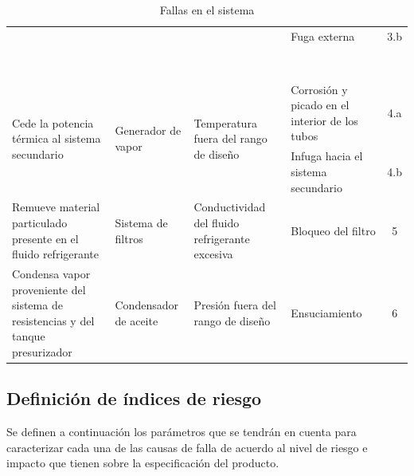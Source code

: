 \documentclass{article}
\begin{document}
\begin{table}[H]
\begin{tabularx}{\textwidth}{XXXXc}
 & & & Fuga externa &  3.b\\ \\ \\ \\ \\ \\ \\ \\ \\\midrule
\multirow{2}{7em}{Cede la potencia térmica al sistema secundario} & \multirow{2}{7em}{Generador de vapor} & \multirow{2}{7em}{Temperatura fuera del rango de diseño} & Corrosión y picado en el interior de los tubos & 4.a \\
 & & & Infuga hacia el sistema secundario &  4.b \\\midrule
Remueve material particulado presente en el fluido refrigerante & Sistema de filtros & Conductividad del fluido refrigerante excesiva & Bloqueo del filtro & 5 \\\midrule
Condensa vapor proveniente del sistema de resistencias y del tanque presurizador & Condensador de aceite & Presión fuera del rango de diseño & Ensuciamiento & 6 \\
\bottomrule
\end{tabularx}
\caption{Fallas en el sistema}
\end{table}
\newpage
\subsection{Definición de índices de riesgo}
Se definen a continuación los parámetros que se tendrán en cuenta para caracterizar cada una de las causas de falla de acuerdo al nivel de riesgo e impacto que tienen sobre la especificación del producto.
\end{document}
